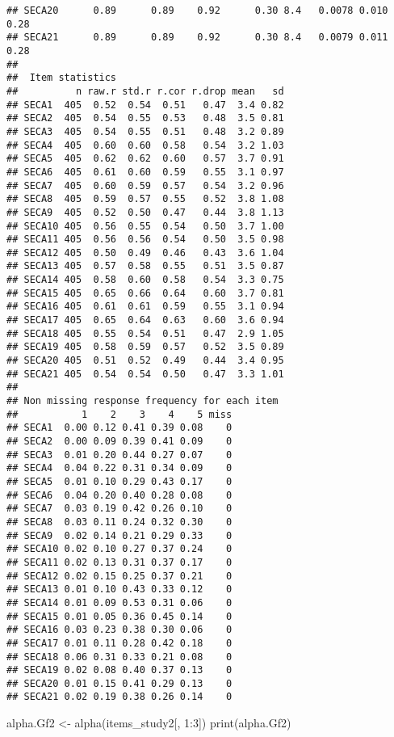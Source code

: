 \documentclass[
]{article}
\newenvironment{Shaded}{\begin{snugshade}}{\end{snugshade}}
\newcommand{\DecValTok}[1]{\textcolor[rgb]{0.00,0.00,0.81}{#1}}
\newcommand{\FunctionTok}[1]{\textcolor[rgb]{0.00,0.00,0.00}{#1}}
\newcommand{\NormalTok}[1]{#1}
\newcommand{\OtherTok}[1]{\textcolor[rgb]{0.56,0.35,0.01}{#1}}
\newcommand{\SpecialCharTok}[1]{\textcolor[rgb]{0.00,0.00,0.00}{#1}}
\begin{document}
\begin{verbatim}
## SECA20      0.89      0.89    0.92      0.30 8.4   0.0078 0.010  0.28
## SECA21      0.89      0.89    0.92      0.30 8.4   0.0079 0.011  0.28
## 
##  Item statistics 
##          n raw.r std.r r.cor r.drop mean   sd
## SECA1  405  0.52  0.54  0.51   0.47  3.4 0.82
## SECA2  405  0.54  0.55  0.53   0.48  3.5 0.81
## SECA3  405  0.54  0.55  0.51   0.48  3.2 0.89
## SECA4  405  0.60  0.60  0.58   0.54  3.2 1.03
## SECA5  405  0.62  0.62  0.60   0.57  3.7 0.91
## SECA6  405  0.61  0.60  0.59   0.55  3.1 0.97
## SECA7  405  0.60  0.59  0.57   0.54  3.2 0.96
## SECA8  405  0.59  0.57  0.55   0.52  3.8 1.08
## SECA9  405  0.52  0.50  0.47   0.44  3.8 1.13
## SECA10 405  0.56  0.55  0.54   0.50  3.7 1.00
## SECA11 405  0.56  0.56  0.54   0.50  3.5 0.98
## SECA12 405  0.50  0.49  0.46   0.43  3.6 1.04
## SECA13 405  0.57  0.58  0.55   0.51  3.5 0.87
## SECA14 405  0.58  0.60  0.58   0.54  3.3 0.75
## SECA15 405  0.65  0.66  0.64   0.60  3.7 0.81
## SECA16 405  0.61  0.61  0.59   0.55  3.1 0.94
## SECA17 405  0.65  0.64  0.63   0.60  3.6 0.94
## SECA18 405  0.55  0.54  0.51   0.47  2.9 1.05
## SECA19 405  0.58  0.59  0.57   0.52  3.5 0.89
## SECA20 405  0.51  0.52  0.49   0.44  3.4 0.95
## SECA21 405  0.54  0.54  0.50   0.47  3.3 1.01
## 
## Non missing response frequency for each item
##           1    2    3    4    5 miss
## SECA1  0.00 0.12 0.41 0.39 0.08    0
## SECA2  0.00 0.09 0.39 0.41 0.09    0
## SECA3  0.01 0.20 0.44 0.27 0.07    0
## SECA4  0.04 0.22 0.31 0.34 0.09    0
## SECA5  0.01 0.10 0.29 0.43 0.17    0
## SECA6  0.04 0.20 0.40 0.28 0.08    0
## SECA7  0.03 0.19 0.42 0.26 0.10    0
## SECA8  0.03 0.11 0.24 0.32 0.30    0
## SECA9  0.02 0.14 0.21 0.29 0.33    0
## SECA10 0.02 0.10 0.27 0.37 0.24    0
## SECA11 0.02 0.13 0.31 0.37 0.17    0
## SECA12 0.02 0.15 0.25 0.37 0.21    0
## SECA13 0.01 0.10 0.43 0.33 0.12    0
## SECA14 0.01 0.09 0.53 0.31 0.06    0
## SECA15 0.01 0.05 0.36 0.45 0.14    0
## SECA16 0.03 0.23 0.38 0.30 0.06    0
## SECA17 0.01 0.11 0.28 0.42 0.18    0
## SECA18 0.06 0.31 0.33 0.21 0.08    0
## SECA19 0.02 0.08 0.40 0.37 0.13    0
## SECA20 0.01 0.15 0.41 0.29 0.13    0
## SECA21 0.02 0.19 0.38 0.26 0.14    0
\end{verbatim}

\begin{Shaded}
\begin{Highlighting}[]
\NormalTok{alpha.Gf2 }\OtherTok{\textless{}{-}} \FunctionTok{alpha}\NormalTok{(items\_study2[, }\DecValTok{1}\SpecialCharTok{:}\DecValTok{3}\NormalTok{])}
\FunctionTok{print}\NormalTok{(alpha.Gf2)}
\end{Highlighting}
\end{Shaded}
\end{document}
